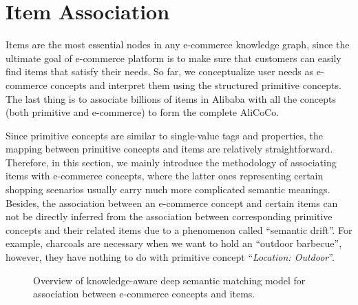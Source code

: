 
\section{Item Association}

\label{sec:item}

Items are the most essential nodes in any e-commerce knowledge graph, since the ultimate goal of e-commerce platform is to make sure that customers can easily find items that satisfy their needs.
So far, we conceptualize user needs as e-commerce concepts and interpret
them using the structured primitive concepts.
The last thing is to associate billions of items in Alibaba with all the concepts (both primitive and e-commerce) to form the complete AliCoCo.

Since primitive concepts are similar to single-value tags and properties, 
the mapping between primitive concepts and items are relatively straightforward.
Therefore, in this section, we mainly introduce the methodology of associating items with e-commerce concepts, where the latter ones representing certain shopping scenarios usually carry much more complicated semantic meanings.
Besides, the association between an e-commerce concept and certain items can not be directly inferred from the association between corresponding primitive concepts and their related items due to a phenomenon called ``semantic drift''.
For example, charcoals are necessary when we want to hold an ``outdoor barbecue'',
however, they have nothing to do with primitive concept ``\textit{Location: Outdoor}''.

\begin{figure}[th]
	\centering
	\caption{Overview of knowledge-aware deep semantic matching model for association between e-commerce concepts and items.
	}
	\label{fig:matching}
\end{figure}

